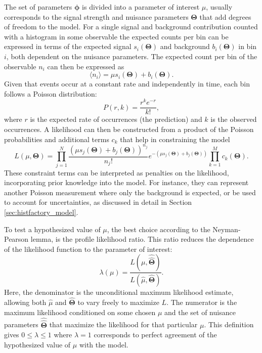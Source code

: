 The set of parameters $\bm{\phi}$ is divided into a parameter of interest $\mu$, usually corresponds to the signal strength and nuisance parameters $\bm{\Theta}$ that add degrees of freedom to the model. For a single signal and background contribution counted with a histogram in some observable the expected counts per bin can be expressed in terms of the expected signal $s_i(\bm{\Theta})$ and background $b_i(\bm{\Theta})$ in bin $i$, both dependent on the nuisance parameters. The expected count per bin of the observable $n_i$ can then be expressed as
\begin{equation} \label{eq:n_i}
    \langle n_i\rangle = \mu s_i(\bm{\Theta}) +b_i(\bm{\Theta}).
\end{equation}
Given that events occur at a constant rate and independently in time, each bin follows a Poisson distribution:
\begin{equation}\label{eq:poisson}
    P(r,k)=\frac{r^k e^{-r}}{k!},
\end{equation}
where $r$ is the expected rate of occurrences (the prediction) and $k$ is the observed occurrences. A likelihood can then be constructed from a product of the Poisson probabilities and additional terms $c_k$ that help in constraining the model
\begin{equation}\label{eq:likelihood}
    L(\mu,\bm{\Theta})=
    \prod_{j=1}^N \frac{(\mu s_j(\bm{\Theta}) + b_j(\bm{\Theta}))^{n_j}}{n_j !} e^{-(\mu s_j(\bm{\Theta}) + b_j(\bm{\Theta}))}
    \prod_{k=1}^M c_k(\bm{\Theta}).
\end{equation}
These constraint terms can be interpreted as penalties on the likelihood, incorporating prior knowledge into the model. For instance, they can represent another Poisson measurement where only the background is expected, or be used to account for uncertainties, as discussed in detail in Section \ref{sec:histfactory_model}.

To test a hypothesized value of $\mu$, the best choice according to the Neyman-Pearson lemma, is the profile likelihood ratio. This ratio reduces the dependence of the likelihood function to the parameter of interest:
\begin{equation}\label{eq:likelihood_ratio}
    \lambda(\mu)=
    \frac{L(\mu,\hat{\hat{\bm{\Theta}}})}
    {L(\hat{\mu},\hat{\bm{\Theta}})}.
\end{equation}
Here, the denominator is the unconditional maximum likelihood estimate, allowing both $\hat{\mu}$ and $\hat{\bm{\Theta}}$ to vary freely to maximize $L$. The numerator is the maximum likelihood conditioned on some chosen $\mu$ and the set of nuisance parameters $\hat{\hat{\bm{\Theta}}}$ that maximize the likelihood for that particular $\mu$. This definition gives $0 \leq \lambda \leq 1$ where $\lambda = 1$ corresponds to perfect agreement of the hypothesized value of $\mu$ with the model.

